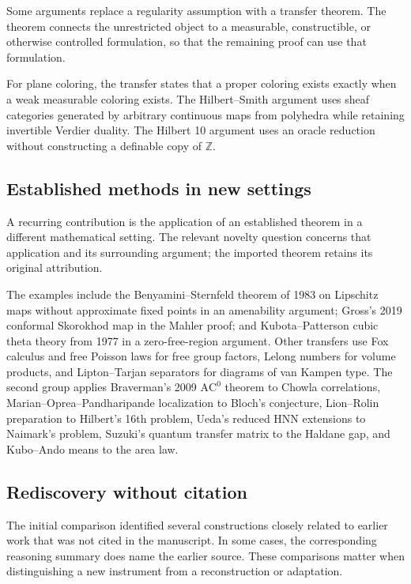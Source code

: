\documentclass[11pt]{article}
\begin{document}
Some arguments replace a regularity assumption with a transfer theorem. The theorem connects the unrestricted object to a measurable, constructible, or otherwise controlled formulation, so that the remaining proof can use that formulation.

For plane coloring, the transfer states that a proper coloring exists exactly when a weak measurable coloring exists. The Hilbert--Smith argument uses sheaf categories generated by arbitrary continuous maps from polyhedra while retaining invertible Verdier duality. The Hilbert 10 argument uses an oracle reduction without constructing a definable copy of $\mathbb{Z}$.

\subsection{\texorpdfstring{Established methods in new settings}{Established methods in new settings}}

A recurring contribution is the application of an established theorem in a different mathematical setting. The relevant novelty question concerns that application and its surrounding argument; the imported theorem retains its original attribution.

The examples include the Benyamini--Sternfeld theorem of 1983 on Lipschitz maps without approximate fixed points in an amenability argument; Gross\textquoteright{}s 2019 conformal Skorokhod map in the Mahler proof; and Kubota--Patterson cubic theta theory from 1977 in a zero-free-region argument. Other transfers use Fox calculus and free Poisson laws for free group factors, Lelong numbers for volume products, and Lipton--Tarjan separators for diagrams of van Kampen type. The second group applies Braverman\textquoteright{}s 2009 $\mathrm{AC}^{0}$ theorem to Chowla correlations, Marian--Oprea--Pandharipande localization to Bloch\textquoteright{}s conjecture, Lion--Rolin preparation to Hilbert\textquoteright{}s 16th problem, Ueda\textquoteright{}s reduced HNN extensions to Naimark\textquoteright{}s problem, Suzuki\textquoteright{}s quantum transfer matrix to the Haldane gap, and Kubo--Ando means to the area law.

\subsection{\texorpdfstring{Rediscovery without citation}{Rediscovery without citation}}

The initial comparison identified several constructions closely related to earlier work that was not cited in the manuscript. In some cases, the corresponding reasoning summary does name the earlier source. These comparisons matter when distinguishing a new instrument from a reconstruction or adaptation.
\end{document}
